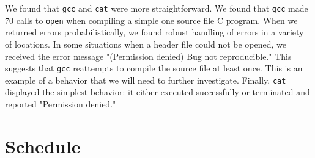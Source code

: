 \documentclass[10pt]{article}
\begin{document}
We found that \texttt{gcc} and \texttt{cat} were more straightforward. We found that \texttt{gcc} made 70 calls to \texttt{open} when compiling a simple one source file C program. When we returned errors probabilistically, we found robust handling of errors in a variety of locations. In some situations when a header file could not be opened, we received the error message "(Permission denied) Bug not reproducible." This suggests that \texttt{gcc} reattempts to compile the source file at least once. This is an example of a behavior that we will need to further investigate. Finally, \texttt{cat} displayed the simplest behavior: it either executed successfully or terminated and reported "Permission denied."


\section{Schedule}
\end{document}
